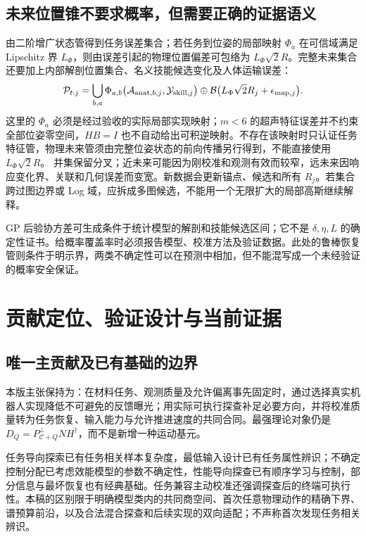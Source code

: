 \documentclass[11pt,a4paper]{article}
\numberwithin{equation}{section}
\theoremstyle{definition}
\begin{document}
\subsection{未来位置锥不要求概率，但需要正确的证据语义}
由二阶增广状态管得到任务误差集合；若任务到位姿的局部映射 $\Phi_a$ 在可信域满足 Lipschitz 界 $L_\Phi$，则由误差引起的物理位置偏差可包络为 $L_\Phi\sqrt2 R$。完整未来集合还要加上内部解剖位置集合、名义技能候选变化及人体运输误差：
\begin{equation}
 \mathcal P_{t:j}=\bigcup_{b,a}\Phi_{a,b}\bigl(\mathcal A_{{\rm anat},b,j},\mathcal Y_{{\rm skill},j}\bigr)
 \oplus\mathcal B\bigl(L_\Phi\sqrt2 R_j+\epsilon_{{\rm map},j}\bigr).
\end{equation}
这里的 $\Phi_a$ 必须是经过验收的实际局部实现映射；$m<6$ 的超声特征误差并不约束全部位姿零空间，$HB=I$ 也不自动给出可积逆映射。不存在该映射时只认证任务特征管，物理未来管须由完整位姿状态的前向传播另行得到，不能直接使用 $L_\Phi\sqrt2 R$。
并集保留分叉；近未来可能因为刚校准和观测有效而较窄，远未来因响应变化界、关联和几何误差而变宽。新数据会更新锚点、候选和所有 $R_j$。若集合跨过图边界或 Log 域，应拆成多图候选，不能用一个无限扩大的局部高斯继续解释。

GP 后验协方差可生成条件于统计模型的解剖和技能候选区间；它不是 $\delta,\eta,L$ 的确定性证书。给概率覆盖率时必须报告模型、校准方法及验证数据。此处的鲁棒恢复管则条件于明示界，两类不确定性可以在预测中相加，但不能混写成一个未经验证的概率安全保证。

\section{贡献定位、验证设计与当前证据}
\label{sec:v43:assessment}
\subsection{唯一主贡献及已有基础的边界}
本版主张保持为：在材料任务、观测质量及允许偏离事先固定时，通过选择真实机器人实现降低不可避免的反馈曝光；用实际可执行探查补足必要方向，并将校准质量转为任务恢复、输入能力与允许推进速度的共同合同。最强理论对象仍是 $D_Q=P_{\mathcal C+Q}^{\perp}NH^\dagger$，而不是新增一种运动基元。

任务导向探索已有任务相关样本复杂度\cite{wagenmaker2021}，最低输入设计已有任务属性辨识\cite{kang2023}；不确定控制分配已考虑效能模型的参数不确定性\cite{grauer2022}，性能导向探查已有顺序学习与控制\cite{venkata2024}，部分信息与最坏恢复也有经典基础\cite{foucart2024}。任务兼容主动校准还强调探查后的终端可执行性\cite{kobayashi2026}。本稿的区别限于明确模型类内的共同商空间、首次任意物理动作的精确下界、谱预算前沿，以及合法混合探查和后续实现的双向适配；不声称首次发现任务相关辨识。
\end{document}

